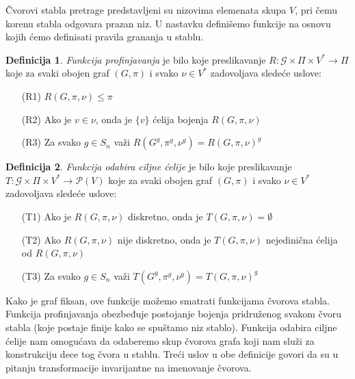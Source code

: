 \documentclass[12pt,oneside]{memoir}
\theoremstyle{definition}
\newtheorem*{definition}{Definicija}
\begin{document}
  Čvorovi stabla pretrage  predstavljeni su nizovima elemenata skupa $V$, pri
  čemu korenu stabla odgovara prazan niz. U nastavku definišemo funkcije na
  osnovu kojih ćemo definisati pravila grananja u stablu.

  \begin{definition}
   \emph{Funkcija profinjavanja} je bilo koje preslikavanje $R : \mathcal{G}
	  \times \Pi \times V^* \to \Pi$ koje za svaki obojen graf $(G, \pi)$ i
	  svako $\nu \in V^*$ zadovoljava sledeće uslove:
  
   \begin{itemize}
       \item[(R1)] $R(G, \pi, \nu) \leq \pi$
       \item[(R2)] Ako je $v \in \nu$, onda je $\{v\}$ ćelija bojenja $R(G,
     	  \pi, \nu)$
       \item[(R3)] Za svako $g \in S_n$ važi $R(G^g, \pi^g, \nu^g) = R(G,
     	 \pi, \nu)^g$
   \end{itemize}
  \end{definition}

  \begin{definition}
   \emph{Funkcija odabira ciljne ćelije} je bilo koje preslikavanje $T :
	  \mathcal{G} \times \Pi \times V^* \to \mathcal{P}(V)$ koje za svaki
	  obojen graf $(G, \pi)$ i svako $\nu \in V^*$ zadovoljava sledeće
	  uslove:
  
   \begin{itemize}
       \item[(T1)] Ako je $R(G, \pi, \nu)$ diskretno, onda je $T(G, \pi, \nu) =
     	  \emptyset$
       \item[(T2)] Ako $R(G, \pi, \nu)$ nije diskretno, onda je $T(G, \pi, \nu)$
     	  nejedinična ćelija od $R(G, \pi, \nu)$
       \item[(T3)] Za svako $g \in S_n$ važi $T(G^g, \pi^g, \nu^g) = T(G, \pi,
     	 \nu)^g$
   \end{itemize}
  \end{definition}

  Kako je graf fiksan, ove funkcije možemo smatrati funkcijama čvorova stabla.
  Funkcija profinjavanja obezbeđuje postojanje bojenja pridruženog svakom čvoru
  stabla (koje postaje finije kako se spuštamo niz stablo). Funkcija odabira
  ciljne ćelije nam omogućava da odaberemo skup čvorova grafa koji nam služi za
  konstrukciju dece tog čvora u stablu. Treći uslov u obe definicije govori da
  su u pitanju transformacije invarijantne na imenovanje čvorova.
\end{document}
